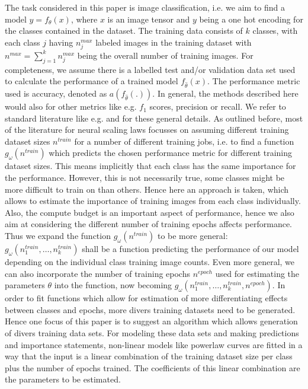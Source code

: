 \documentclass{article} %
\begin{document}
The task considered in this paper is image classification, i.e. we aim to find a model $y = f_{\theta}(x)$, where $x$ is an image tensor and $y$ being a one hot encoding for the classes contained in the dataset.
The training data consists of $k$ classes, with each class $j$ having $n_j^{max}$ labeled images in the training dataset with $n^{max} = \sum_{j= 1}^k n_j^{max}$ being the overall number of training images.
For completeness, we assume there is a labelled test and/or validation data set used to calculate the performance of a trained model $f_{\hat{\theta}}(x)$.
The performance metric used is accuracy, denoted as $a(f_{\hat{\theta}}(.))$. In general, the methods described here would also for other metrics like e.g. $f_1$ scores, precision or recall.
We refer to standard literature like e.g. \cite{Goodfellowetal2016} and \cite{Bishop2006PatternRecog} for these general details.
As outlined before, most of the literature for neural scaling laws focusses on assuming different training dataset sizes $n^{train}$ for a number of different training jobs, i.e. to find a function $g_{\omega}(n^{train})$ which predicts the chosen performance metric for different training dataset sizes.
This means implicitly that each class has the same importance for the performance.
However, this is not necessarily true, some classes might be more difficult to train on than others.
Hence here an approach is taken, which allows to estimate the importance of training images from each class individually.
Also, the compute budget is an important aspect of performance, hence we also aim at considering the different number of training epochs affects performance.
Thus we expand the function $g_{\omega}(n^{train})$ to be more general: $g_{\omega}(n_1^{train}, \dots, n_k^{train})$ shall be a function predicting the performance of our model depending on the individual class training image counts.
Even more general, we can also incorporate the number of training epochs $n^{epoch}$ used for estimating the parameters $\theta$ into the function, now becoming $g_{\omega}(n_1^{train}, \dots, n_k^{train}, n^{epoch})$.
In order to fit functions which allow for estimation of more differentiating effects between classes and epochs, more divers training datasets need to be generated.
Hence one focus of this paper is to suggest an algorithm which allows generation of divers training data sets.
For modeling these data sets and making predictions and importance statements, non-linear models like powerlaw curves are fitted in a way that the input is a linear combination of the training dataset size per class plus the number of epochs trained.
The coefficients of this linear combination are the parameters to be estimated.
\end{document}
